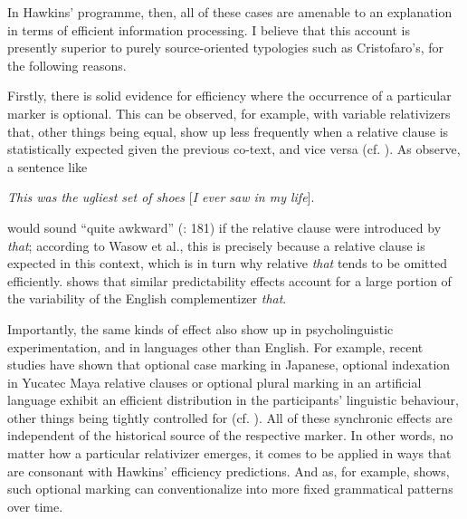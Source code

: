 \documentclass[output=paper]{langsci/langscibook}
\begin{document}
In Hawkins’ programme, then, all of these cases are amenable to an explanation in terms of efficient information processing. I believe that this account is presently superior to purely source-oriented typologies such as Cristofaro’s, for the following reasons.

Firstly, there is solid evidence for efficiency where the occurrence of a particular marker is optional. This can be observed, for example, with variable relativizers that, other things being equal, show up less frequently when a relative clause is statistically expected given the previous co-text, and vice versa (cf. \citealt{WasowEtAl2011}). As \citet{FoxThompson2007} observe, a sentence like

\ea
{\textit{This was the ugliest set of shoes} [\textit{I ever saw in my life}].} \\
\z

would sound “quite awkward” (\citealt{WasowEtAl2011}: 181) if the relative clause were introduced by \textit{that}; according to Wasow et al., this is precisely because a relative clause is expected in this context, which is in turn why relative \textit{that} tends to be omitted efficiently. \citet{Jaeger2010} shows that similar predictability effects account for a large portion of the variability of the English complementizer \textit{that}. 

Importantly, the same kinds of effect also show up in psycholinguistic experimentation, and in languages other than English. For example, recent studies have shown that optional case marking in Japanese, optional indexation in Yucatec Maya relative clauses or optional plural marking in an artificial language exhibit an efficient distribution in the participants’ linguistic behaviour, other things being tightly controlled for (cf. \citealt{KurumadaJaeger2015,NorcliffeJaeger2016,KurumadaGrimm2017}). All of these synchronic effects are independent of the historical source of the respective marker. In other words, no matter how a particular relativizer emerges, it comes to be applied in ways that are consonant with Hawkins’ efficiency predictions. And as, for example,  shows, such optional marking can conventionalize into more fixed grammatical patterns over time.
\end{document}
